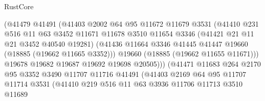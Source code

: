 \begin{lexlean}{RustCore}
\begin{coremodule}
                              (@41479
                                @41491
                                (@41403
                                  @2002
                                  @64
                                  @95
                                  @11672
                                  @11679
                                  @3531
                                  (@41410
                                    @231
                                    @516
                                    @11
                                    @63
                                    @3452
                                    @11671
                                    @11678
                                    @3510
                                    @11654
                                    @3346
                                    (@41421 @21 @11 @21 @3452 @40540 @19281)
                                    (@41436
                                      @11664
                                      @3346
                                      @41445
                                      @41447
                                      @19660
                                      (@18885 (@19662 @11665 @3352)))
                                    @19660
                                    (@18885 (@19662 @11655 @11671)))
                                  @19678
                                  @19682
                                  @19687
                                  @19692
                                  @19698
                                  @20505)))
                            (@41471
                              @11683
                              @264
                              @2170
                              @95
                              @3352
                              @3490
                              @11707
                              @11716
                              @41491
                              (@41403
                                @2169
                                @64
                                @95
                                @11707
                                @11714
                                @3531
                                (@41410
                                  @219
                                  @516
                                  @11
                                  @63
                                  @3936
                                  @11706
                                  @11713
                                  @3510
                                  @11689

\end{coremodule}
\end{lexlean}
